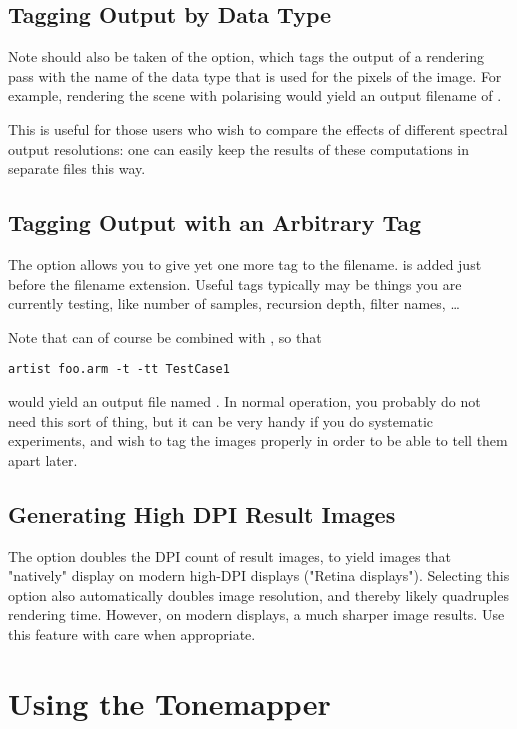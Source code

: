 \subsection{Tagging Output by Data Type}
Note should also be taken of the  option, which tags the output of a
rendering pass with the name of the data type that is used for the pixels of the image. For example,
rendering the scene  with  polarising  would yield an output filename of
.

This is useful for those users who wish to compare \eg the effects of different spectral output resolutions: one can easily keep the results of these computations in separate files this way. 


\subsection{Tagging Output with an Arbitrary Tag}
The option  allows you to give yet one more tag
to the filename.   is added just before the
filename extension. Useful tags typically may be things you are currently
testing, like number of samples, recursion depth, filter names, \ldots

Note that  can of course be combined with , so that

\begin{verbatim}
artist foo.arm -t -tt TestCase1
\end{verbatim}

would yield an output file named . In normal operation, you probably do not need this sort of thing, but it can be very handy if you \eg do systematic experiments, and wish to tag the images properly in order to be able to tell them apart later.

\subsection{Generating High DPI Result Images}
The option  doubles the DPI count of result images, to yield images that "natively" display on modern high-DPI displays ("Retina displays"). Selecting this option also automatically doubles image resolution, and thereby likely quadruples rendering time. However, on modern displays, a much sharper image results. Use this feature with care when appropriate.

\section{Using the Tonemapper}

